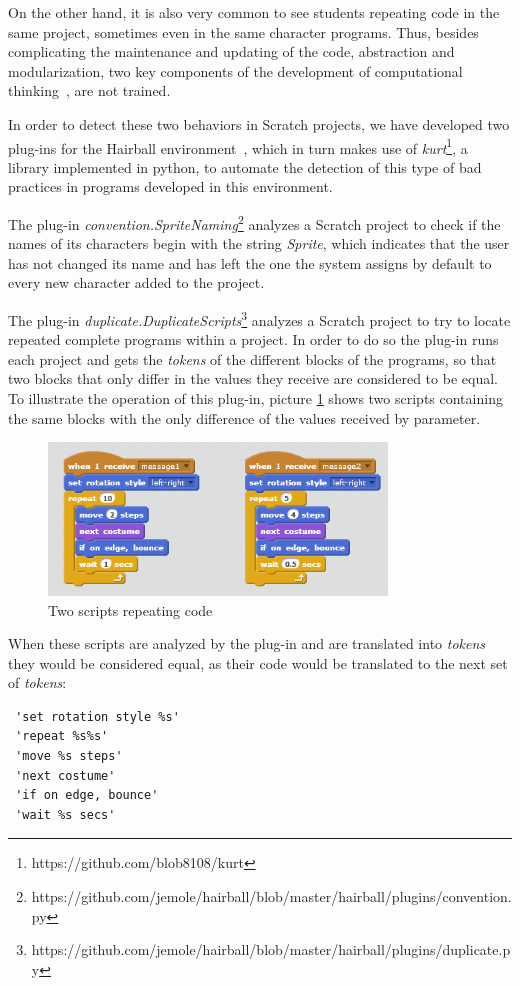 \documentclass[conference]{format/IEEEtran}
\begin{document}
On the other hand, it is also very common to see students repeating code in the same project, sometimes even in the same character programs. Thus, besides complicating the maintenance and updating of the code, abstraction and modularization, two key components of the development of computational thinking~\cite{wing2008computational}, are not trained.

In order to detect these two behaviors in Scratch projects, we have developed two plug-ins for the Hairball environment~\cite{boe2013hairball}, which in turn makes use of \textit{kurt}\footnote{https://github.com/blob8108/kurt}, a library implemented in python, to automate the detection of this type of bad practices in programs developed in this environment.

The plug-in \textit{convention.SpriteNaming}\footnote{https://github.com/jemole/hairball/blob/master/hairball/plugins/convention.py} analyzes a Scratch project to check if the names of its characters begin with the string \textit{Sprite}, which indicates that the user has not changed its name and has left the one the system assigns by default to every new character added to the project.

The plug-in \textit{duplicate.DuplicateScripts}\footnote{https://github.com/jemole/hairball/blob/master/hairball/plugins/duplicate.py} analyzes a Scratch project to try to locate repeated complete programs within a project. In order to do so the plug-in runs each project and gets the \textit{tokens} of the different blocks of the programs, so that two blocks that only differ in the values they receive are considered to be equal. To illustrate the operation of this plug-in, picture \ref{fig:CodeRepetition1} shows two scripts containing the same blocks with the only difference of the values received by parameter.
\begin{figure}
  \centering
    \includegraphics[width=9cm]{img/CodeRepetition1.png}
  \caption{Two scripts repeating code}
  \label{fig:CodeRepetition1}
\end{figure}


When these scripts are analyzed by the plug-in and are translated into \textit{tokens} they would be considered equal, as their code would be translated to the next set of \textit{tokens}:
\begin{verbatim}
 'set rotation style %s'
 'repeat %s%s'
 'move %s steps'
 'next costume'
 'if on edge, bounce'
 'wait %s secs'
\end{verbatim}
\end{document}
